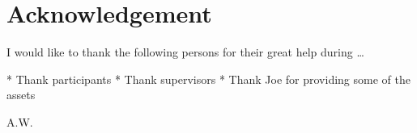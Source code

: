 \chapter*{Acknowledgement}
I would like to thank the following persons for their great help during \ldots

* Thank participants
* Thank supervisors
* Thank Joe for providing some of the assets

\begin{flushright}
A.W.\\[1pc]
\end{flushright}